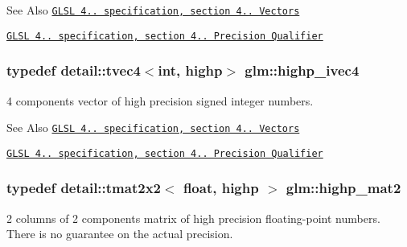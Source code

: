\begin{DoxySeeAlso}{See Also}
\href{http://www.opengl.org/registry/doc/GLSLangSpec.4.20.8.pdf}{\tt G\-L\-S\-L 4.. specification, section 4.. Vectors} 

\href{http://www.opengl.org/registry/doc/GLSLangSpec.4.20.8.pdf}{\tt G\-L\-S\-L 4.. specification, section 4.. Precision Qualifier} 
\end{DoxySeeAlso}
\hypertarget{group__core__precision_gaeba08fcf78aeae954c3335d73500ff8b}{
\subsubsection[{highp\-\_\-ivec4}]{\setlength{\rightskip}{0pt plus 5cm}typedef detail\-::tvec4$<$int, highp$>$ {\bf glm\-::highp\-\_\-ivec4}}}\label{group__core__precision_gaeba08fcf78aeae954c3335d73500ff8b}
4 components vector of high precision signed integer numbers.

\begin{DoxySeeAlso}{See Also}
\href{http://www.opengl.org/registry/doc/GLSLangSpec.4.20.8.pdf}{\tt G\-L\-S\-L 4.. specification, section 4.. Vectors} 

\href{http://www.opengl.org/registry/doc/GLSLangSpec.4.20.8.pdf}{\tt G\-L\-S\-L 4.. specification, section 4.. Precision Qualifier} 
\end{DoxySeeAlso}
\hypertarget{group__core__precision_gab9884251d84b95dbbf27aa1e4b3a1ec7}{
\subsubsection[{highp\-\_\-mat2}]{\setlength{\rightskip}{0pt plus 5cm}typedef detail\-::tmat2x2$<$ float, highp $>$ {\bf glm\-::highp\-\_\-mat2}}}\label{group__core__precision_gab9884251d84b95dbbf27aa1e4b3a1ec7}
2 columns of 2 components matrix of high precision floating-\/point numbers. There is no guarantee on the actual precision.


